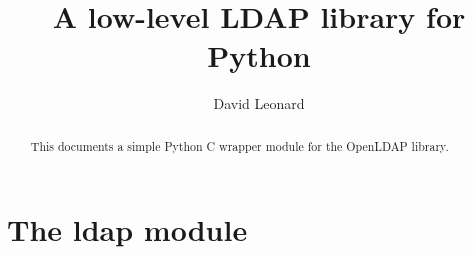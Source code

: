 \documentclass{manual}
\title{A low-level LDAP library for Python}
\author{David Leonard}
\begin{document}
\maketitle

\begin{abstract}
\noindent
This documents a simple Python C wrapper module for the OpenLDAP library.
\end{abstract}

\tableofcontents

\chapter{ The ldap module }




\renewcommand{\indexname}{Index}
\end{document}
